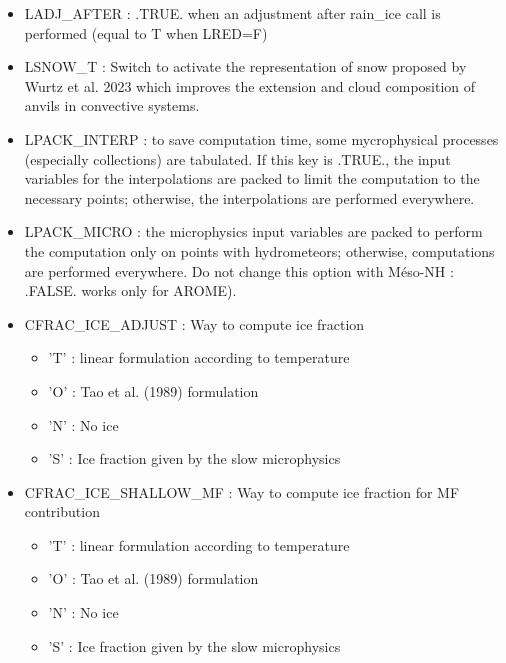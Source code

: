 \begin{itemize}
\item 
LADJ\_AFTER  : .TRUE. when an adjustment after rain\_ice call is performed (equal to T when LRED=F)

\item {}
LSNOW\_T : Switch to activate the representation of snow proposed by Wurtz et al. 2023 which improves the extension and cloud composition of anvils in convective systems.

\item
LPACK\_INTERP  : to save computation time, some mycrophysical processes (especially collections) are tabulated. If this key is .TRUE., the input variables for the interpolations are packed to limit the computation to the necessary points; otherwise, the interpolations are performed everywhere.

\item
LPACK\_MICRO  : the microphysics input variables are packed to perform the computation only on points with hydrometeors; otherwise, computations are performed everywhere. Do not change this option with Méso-NH : .FALSE. works only for AROME).

\item 
CFRAC\_ICE\_ADJUST   : Way to compute ice fraction 
\begin{itemize}
\item{'T'} : linear formulation according to temperature
\item{'O'} : Tao et al. (1989) formulation
\item{'N'} : No ice
\item{'S'} : Ice fraction given by the slow microphysics
\end{itemize}

\item 
CFRAC\_ICE\_SHALLOW\_MF : Way to compute ice fraction for MF contribution
\begin{itemize}
\item{'T'} : linear formulation according to temperature
\item{'O'} : Tao et al. (1989) formulation
\item{'N'} : No ice
\item{'S'} : Ice fraction given by the slow microphysics
\end{itemize}


\end{itemize}
